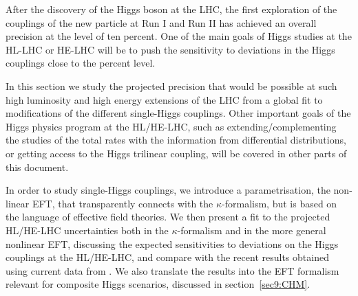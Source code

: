 After the discovery of the Higgs boson at the LHC, the first exploration of the couplings of the new particle at Run I and Run II has achieved an overall precision at the level of ten percent. One of the main goals of Higgs studies at the HL-LHC or HE-LHC will be to push the sensitivity to deviations in the Higgs couplings close to the percent level. 

In this section we study the projected precision that would be possible at such high luminosity and high energy extensions of the LHC from a global fit to modifications of the different single-Higgs couplings. Other important goals of the Higgs physics program at the HL/HE-LHC, such as extending/complementing the studies of the total rates with the information from differential distributions, or getting access to the Higgs trilinear coupling, will be covered in other parts of this document. 


In order to study single-Higgs couplings, we introduce a parametrisation, the non-linear EFT, that transparently connects with the $\kappa$-formalism, but is based on the language of effective field theories. 
 We then present a fit to the projected HL/HE-LHC uncertainties both in the $\kappa$-formalism and in the more general nonlinear EFT, discussing the expected sensitivities to deviations on the Higgs couplings at the HL/HE-LHC, and compare with the recent results obtained using current data from \cite{deBlas:2018tjm}. We also translate the results into the EFT formalism relevant for composite Higgs scenarios, discussed in section~\ref{sec9:CHM}.
 


